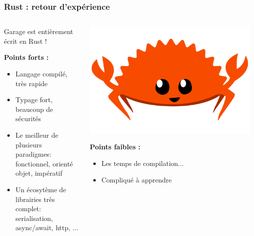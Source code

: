\documentclass[aspectratio=169]{beamer}
\begin{document}
\begin{frame}
	\frametitle{Rust : retour d'expérience}

	\begin{columns}
	\begin{column}{0.55\textwidth}
		Garage est entièrement écrit en Rust !
		\vspace{2em}

		\textbf{Points forts :}
		\vspace{.5em}
		\begin{itemize}
			\item Langage compilé, très rapide
				\vspace{.5em}
			\item Typage fort, beaucoup de sécurités
				\vspace{.5em}
			\item Le meilleur de plusieurs paradigmes:
				fonctionnel, orienté objet, impératif
				\vspace{.5em}
			\item Un écosytème de librairies très complet:
				serialisation, async/await, http, ...
		\end{itemize}
	\end{column}
	
	\begin{column}{0.45\textwidth}
		\begin{centering}
			\hspace{2em}\includegraphics[width=0.55\columnwidth]{img/rustacean-flat-happy.png}
		\end{centering}

		\vspace{2em}
		\textbf{Points faibles :}
		\vspace{.5em}
		\begin{itemize}
			\item Les temps de compilation...
				\vspace{.5em}
			\item Compliqué à apprendre
		\end{itemize}
		\vspace{2em}
	\end{column}
	\end{columns}

\end{frame}
\end{document}
